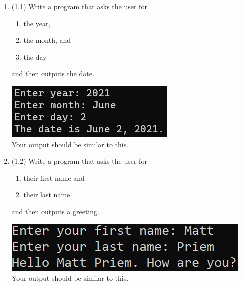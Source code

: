 \documentclass{article}
\begin{document}
\begin{enumerate}
\item (1.1) Write a program that asks the user for \\
		\begin{minipage}{0.5\textwidth}	
		\vspace*{-0.5em}
			\begin{enumerate}  \setlength\itemsep{-0.3em}
				\item the year,
				\item the month, and
				\item the day	
			\end{enumerate} \vspace*{-1ex}
		and then outputs the date.
		\end{minipage}
		\begin{minipage}{0.5\textwidth}
			\centering
			\includegraphics[scale=0.75]{./imgs/dateOutput.png}\\
			Your output should be similar to this.
		\end{minipage}

	

\item (1.2) 
		Write a program that asks the user for \\
		\begin{minipage}{0.5\textwidth}
		\vspace*{-0.5em}
			\begin{enumerate}  \setlength\itemsep{-0.3em}
				\item their first name and
				\item their last name.  
			\end{enumerate} \vspace*{-1ex}
		and then outputs a greeting.
		\end{minipage}
		\begin{minipage}{0.5\textwidth}
			\centering
			\includegraphics[scale=0.9]{./imgs/outputGreeting.png}\\
			Your output should be similar to this.
		\end{minipage}


\end{enumerate}
\end{document}
